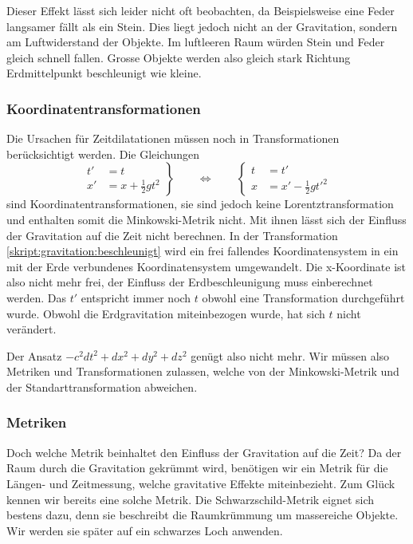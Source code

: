 \begin{refsection}
	Dieser Effekt lässt sich leider nicht oft beobachten, da Beispielsweise eine Feder langsamer fällt als ein Stein. Dies liegt jedoch nicht an der Gravitation, sondern am Luftwiderstand der Objekte. Im luftleeren Raum würden Stein und Feder gleich schnell fallen. Grosse Objekte werden also gleich stark Richtung Erdmittelpunkt beschleunigt wie kleine.
	
	\subsubsection{Koordinatentransformationen}
    Die Ursachen für Zeitdilatationen müssen noch in Transformationen berücksichtigt werden. 
	Die Gleichungen 
	\begin{equation}\label{skript:gravitation:beschleunigt}
	\left.
	\begin{aligned}
	t'&=t\\
	x'&=x+\frac12gt^2
	\end{aligned}
	\right\}
	\qquad
	\Leftrightarrow
	\qquad
	\left\{
	\begin{aligned}
	t&=t'\\
	x&=x'-\frac12gt'^2
	\end{aligned}
	\right.
	\end{equation}
    sind Koordinatentransformationen, sie sind jedoch keine Lorentztransformation und enthalten somit die Minkowski-Metrik nicht. Mit ihnen lässt sich der Einfluss der Gravitation auf die Zeit nicht berechnen. 
    In der Transformation \ref{skript:gravitation:beschleunigt} wird ein frei fallendes Koordinatensystem in ein mit der Erde verbundenes Koordinatensystem umgewandelt. Die x-Koordinate ist also nicht mehr frei, der Einfluss der Erdbeschleunigung muss einberechnet werden.
	Das $t'$ entspricht immer noch $t$ obwohl eine Transformation durchgeführt wurde. Obwohl die Erdgravitation miteinbezogen wurde, hat sich $t$ nicht verändert.
	
	Der Ansatz $ -c^2dt^2 + dx^2 + dy^2 + dz^2$ genügt also nicht mehr. Wir müssen also Metriken und Transformationen zulassen, welche von der Minkowski-Metrik und der Standarttransformation abweichen.
	
	\subsubsection{Metriken}\label{skript:chapter:zeitreisen:metriken}
	Doch welche Metrik beinhaltet den Einfluss der Gravitation auf die Zeit? 
	Da der Raum durch die Gravitation gekrümmt wird, benötigen wir ein Metrik für die Längen- und Zeitmessung, welche gravitative Effekte miteinbezieht.
	Zum Glück kennen wir bereits eine solche Metrik. Die Schwarzschild-Metrik eignet sich bestens dazu, denn sie beschreibt die Raumkrümmung um massereiche Objekte. Wir werden sie später auf ein schwarzes Loch anwenden. 


\end{refsection}

